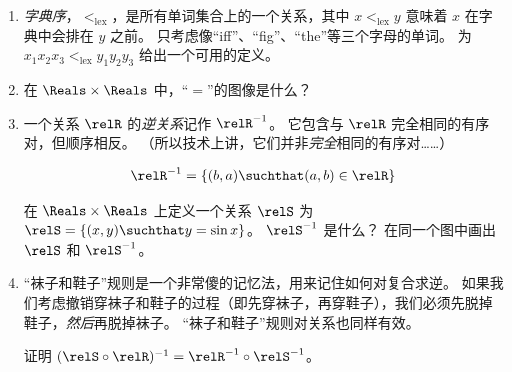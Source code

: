 \begin{enumerate}
    \item {}\emph{字典序}，$<_{\mbox{lex}}$，是所有单词集合上的一个关系，其中 $x <_{\mbox{lex}} y$ 意味着 $x$ 在字典中会排在 $y$ 之前。
    只考虑像“iff”、“fig”、“the”等三个字母的单词。
    为 $x_1x_2x_3 <_{\mbox{lex}} y_1y_2y_3$ 给出一个可用的定义。
    
    \wbvfill
    
    \workbookpagebreak
    
    \item 在 $\Reals \times \Reals$ 中，“$=$”的图像是什么？
    
    \wbvfill
    
    
    \item  一个关系 $\relR$ 的\emph{逆关系}记作 $\relR^{-1}$。
    它包含与 $\relR$ 完全相同的有序对，但顺序相反。
    （所以技术上讲，它们并非\emph{完全}相同的有序对……）
    
    \[ \relR^{-1} = \{ (b,a) \suchthat (a,b) \in \relR \} \]
    
    \noindent 在 $\Reals \times \Reals$ 上定义一个关系 $\relS$ 为
    $\relS = \{ (x,y) \suchthat y = \sin x \}$。
    $\relS^{-1}$ 是什么？
    在同一个图中画出 $\relS$ 和 $\relS^{-1}$。
    
    \wbvfill
    
    \rule{0pt}{0pt}
    
    \wbvfill
    
    \workbookpagebreak
    
    
    \item “袜子和鞋子”规则是一个非常傻的记忆法，用来记住如何对复合求逆。
    如果我们考虑撤销穿袜子和鞋子的过程（即先穿袜子，再穿鞋子），我们必须先脱掉鞋子，\emph{然后}再脱掉袜子。
    “袜子和鞋子”规则对关系也同样有效。
    
    证明 $(\relS \circ \relR)^{-1} = \relR^{-1} \circ \relS^{-1}$。
    
    \wbvfill
    
    \workbookpagebreak
    
    \end{enumerate} 
    
